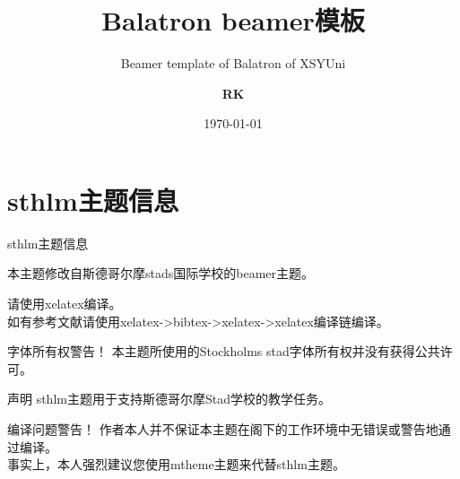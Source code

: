 \documentclass[newPxFont,sthlmFooter]{beamer}
\title{Balatron beamer模板}
\subtitle{Beamer template of Balatron of XSYUni}
\author{\textbf{RK}}
\institute{\small{rk.fake@fake.com}}
\date{\today}
\begin{document}
%
%

\maketitle


%
%

\section*{sthlm主题信息}


\begin{frame}[c]{sthlm主题信息}

{本主题修改自斯德哥尔摩stads国际学校的beamer主题}。

\vspace{1em}
请使用xelatex编译。\\
如有参考文献请使用xelatex->bibtex->xelatex->xelatex编译链编译。
\begin{alertblock}{字体所有权警告！}
本主题所使用的Stockholms stad字体所有权并没有获得公共许可。 
\end{alertblock}

\end{frame}


\begin{frame}[c]{声明}
sthlm主题用于支持斯德哥尔摩Stad学校的教学任务。 \\

\vspace{1em}

\begin{alertblock}{编译问题警告！}
作者本人并不保证本主题在阁下的工作环境中无错误或警告地通过编译。 \\
\vspace{1em}
事实上，本人强烈建议您使用mtheme主题来代替sthlm主题。
\end{alertblock}

\end{frame}
\end{document}
